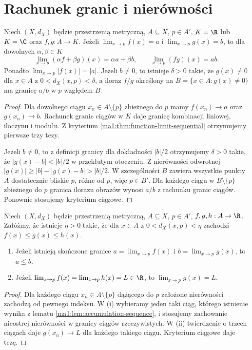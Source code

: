 \section{Rachunek granic i nierówności}
\begin{twierdzenie}
\label{ma1:thm:function-limit-algebra}
Niech $(X,d_X)$ będzie przestrzenią metryczną, $A\subseteq X$, $p\in A'$, $K=\R$ lub $K=\C$ oraz $f,g:A\to K$. Jeżeli $\lim_{x\to p}f(x)=a$ i $\lim_{x\to p}g(x)=b$, to dla dowolnych $\alpha,\beta\in K$
\[
 \lim_{x\to p}(\alpha f+\beta g)(x)=\alpha a+\beta b,
 \qquad \lim_{x\to p}(fg)(x)=ab.
\]
Ponadto $\lim_{x\to p}|f(x)|=|a|$. Jeżeli $b\ne0$, to istnieje $\delta>0$ takie, że $g(x)\ne0$ dla $x\in A$ z $0<d_X(x,p)<\delta$, a iloraz $f/g$ określony na $B=\{x\in A:g(x)\ne0\}$ ma granicę $a/b$ w $p$ względem $B$.
\end{twierdzenie}
\begin{proof}
Dla dowolnego ciągu $x_n\in A\setminus\{p\}$ zbieżnego do $p$ mamy $f(x_n)\to a$ oraz $g(x_n)\to b$. Rachunek granic ciągów w $K$ daje granicę kombinacji liniowej, iloczynu i modułu. Z kryterium \ref{ma1:thm:function-limit-sequential} otrzymujemy pierwsze trzy tezy.

Jeżeli $b\ne0$, to z definicji granicy dla dokładności $|b|/2$ otrzymujemy $\delta>0$ takie, że $|g(x)-b|<|b|/2$ w przekłutym otoczeniu. Z nierówności odwrotnej $|g(x)|\ge|b|-|g(x)-b|>|b|/2$. W szczególności $B$ zawiera wszystkie punkty $A$ dostatecznie bliskie $p$, różne od $p$, więc $p\in B'$. Dla każdego ciągu w $B\setminus\{p\}$ zbieżnego do $p$ granica ilorazu obrazów wynosi $a/b$ z rachunku granic ciągów. Ponownie stosujemy kryterium ciągowe.
\end{proof}

\begin{twierdzenie}
\label{ma1:thm:function-limit-order}
Niech $(X,d_X)$ będzie przestrzenią metryczną, $A\subseteq X$, $p\in A'$, $f,g,h:A\to\R$. Załóżmy, że istnieje $\eta>0$ takie, że dla $x\in A$ z $0<d_X(x,p)<\eta$ zachodzi $f(x)\le g(x)\le h(x)$.
\begin{enumerate}[label=(\roman*)]
\item Jeżeli istnieją skończone granice $a=\lim_{x\to p}f(x)$ i $b=\lim_{x\to p}g(x)$, to $a\le b$.
\item Jeżeli $\lim_{x\to p}f(x)=\lim_{x\to p}h(x)=L\in\R$, to $\lim_{x\to p}g(x)=L$.
\end{enumerate}
\end{twierdzenie}
\begin{proof}
Dla każdego ciągu $x_n\in A\setminus\{p\}$ dążącego do $p$ założone nierówności zachodzą od pewnego indeksu. W (i) wybieramy jeden taki ciąg, którego istnienie wynika z lematu \ref{ma1:lem:accumulation-sequence}, i stosujemy zachowanie nieostrej nierówności w granicy ciągów rzeczywistych. W (ii) twierdzenie o trzech ciągach daje $g(x_n)\to L$ dla każdego takiego ciągu. Kryterium ciągowe daje tezę.
\end{proof}

